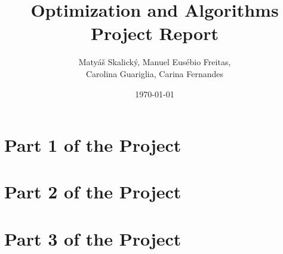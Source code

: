 \documentclass[12pt, a4paper]{report}
\title{Optimization and Algorithms \\ Project Report}
\author{Matyáš Skalický, Manuel Eusébio Freitas, \\Carolina Guariglia, Carina Fernandes}
\date{\today}
\begin{document}
\maketitle

\tableofcontents
 
\chapter{Part 1 of the Project}
%

\chapter{Part 2 of the Project}
%

\chapter{Part 3 of the Project}
%
\end{document}
